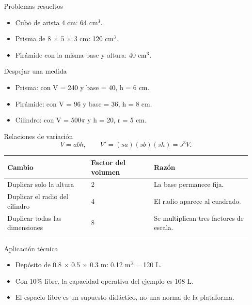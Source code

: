 \documentclass[
	spanish,
	aspectratio=1610,
	xcolor={dvipsnames,table}
]{beamer}
\begin{document}
\begin{frame}{Problemas resueltos}
\fontsize{14}{18}\selectfont\begin{itemize}\setlength{\itemsep}{.45cm}
\item Cubo de arista 4 cm: 64 cm$^3$.
\item Prisma de 8 $\times$ 5 $\times$ 3 cm: 120 cm$^3$.
\item Pirámide con la misma base y altura: 40 cm$^3$.
\end{itemize}
\end{frame}
\begin{frame}{Despejar una medida}
\fontsize{14}{18}\selectfont\begin{itemize}\setlength{\itemsep}{.45cm}
\item Prisma: con V = 240 y base = 40, h = 6 cm.
\item Pirámide: con V = 96 y base = 36, h = 8 cm.
\item Cilindro: con V = 500$\pi$ y h = 20, r = 5 cm.
\end{itemize}
\end{frame}
\begin{frame}{Relaciones de variación}
\fontsize{14}{18}\selectfont\[V=abh,\qquad V'=(sa)(sb)(sh)=s^3V.\]
\small\renewcommand{\arraystretch}{1.45}\begin{tabularx}{\linewidth}{X|X|X}\toprule
\textbf{Cambio} & \textbf{Factor del volumen} & \textbf{Razón}\\\midrule
Duplicar solo la altura & 2 & La base permanece fija.\\\addlinespace
Duplicar el radio del cilindro & 4 & El radio aparece al cuadrado.\\\addlinespace
Duplicar todas las dimensiones & 8 & Se multiplican tres factores de escala.\\\addlinespace
\bottomrule\end{tabularx}
\end{frame}
\begin{frame}{Aplicación técnica}
\fontsize{14}{18}\selectfont\begin{itemize}\setlength{\itemsep}{.45cm}
\item Depósito de 0.8 $\times$ 0.5 $\times$ 0.3 m: 0.12 m$^3$ = 120 L.
\item Con 10\% libre, la capacidad operativa del ejemplo es 108 L.
\item El espacio libre es un supuesto didáctico, no una norma de la plataforma.
\end{itemize}
\end{frame}
\end{document}
